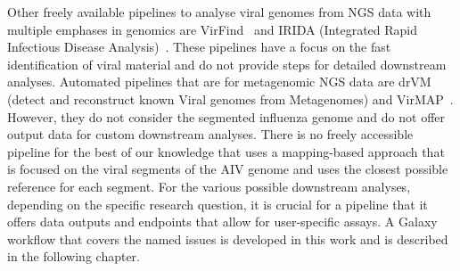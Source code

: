 Other freely available pipelines to analyse viral genomes from NGS data with multiple emphases in genomics are VirFind~\cite{ho2014development} and IRIDA (Integrated Rapid Infectious Disease Analysis)~\cite{matthews2018integrated}. These pipelines have a focus on the fast identification of viral material and do not provide steps for detailed downstream analyses. Automated pipelines that are for metagenomic NGS data are drVM (detect and reconstruct known Viral genomes from Metagenomes) and VirMAP~\cite{lin2017drvm, ajami2018maximal}. However, they do not consider the segmented influenza genome and do not offer output data for custom downstream analyses. There is no freely accessible pipeline for the best of our knowledge that uses a mapping-based approach that is focused on the viral segments of the AIV genome and uses the closest possible reference for each segment. For the various possible downstream analyses, depending on the specific research question, it is crucial for a pipeline that it offers data outputs and endpoints that allow for user-specific assays. A Galaxy workflow that covers the named issues is developed in this work and is described in the following chapter.
